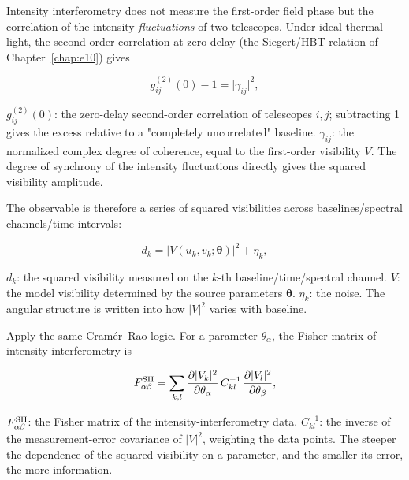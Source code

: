 Intensity interferometry does not measure the first-order field phase but the correlation of the intensity \emph{fluctuations} of two telescopes. Under ideal thermal light, the second-order correlation at zero delay (the Siegert/HBT relation of Chapter~\ref{chap:e10}) gives

\begin{equation}
  g_{ij}^{(2)}(0)-1=\big|\gamma_{ij}\big|^{2},
  \label{eq:e12-hbt}
\end{equation}
\begin{formulaexplain}
$g_{ij}^{(2)}(0)$: the zero-delay second-order correlation of telescopes $i,j$; subtracting 1 gives the excess relative to a "completely uncorrelated" baseline. $\gamma_{ij}$: the normalized complex degree of coherence, equal to the first-order visibility $V$. The degree of synchrony of the intensity fluctuations directly gives the squared visibility amplitude.
\end{formulaexplain}

The observable is therefore a series of squared visibilities across baselines/spectral channels/time intervals:

\begin{equation}
  d_{k}=\big|V(u_k,v_k;\bm\theta)\big|^{2}+\eta_{k},
  \label{eq:e12-sii-data}
\end{equation}
\begin{formulaexplain}
$d_k$: the squared visibility measured on the $k$-th baseline/time/spectral channel. $V$: the model visibility determined by the source parameters $\bm\theta$. $\eta_k$: the noise. The angular structure is written into how $|V|^2$ varies with baseline.
\end{formulaexplain}

Apply the same Cramér--Rao logic. For a parameter $\theta_\alpha$, the Fisher matrix of intensity interferometry is

\begin{equation}
  F_{\alpha\beta}^{\rm SII}
  =\sum_{k,l}
  \frac{\partial|V_k|^{2}}{\partial\theta_\alpha}\,
  C^{-1}_{kl}\,
  \frac{\partial|V_l|^{2}}{\partial\theta_\beta},
  \label{eq:e12-sii-fisher}
\end{equation}
\begin{formulaexplain}
$F_{\alpha\beta}^{\rm SII}$: the Fisher matrix of the intensity-interferometry data. $C^{-1}_{kl}$: the inverse of the measurement-error covariance of $|V|^2$, weighting the data points. The steeper the dependence of the squared visibility on a parameter, and the smaller its error, the more information.
\end{formulaexplain}

